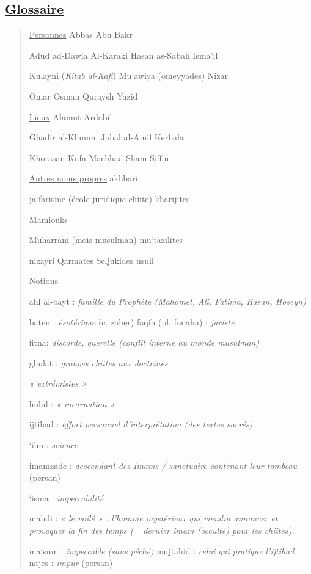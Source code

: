 \hypertarget{glossaire-5}{%
\subsection{\texorpdfstring{\underline{Glossaire}}{Glossaire}}\label{glossaire-5}}

\begin{quote}
\underline{Personnes} Abbas Abu Bakr

Adud ad-Dawla Al-Karaki Hasan as-Sabah Isma'il

Kulayni (\emph{Kitab al-Kafi}) Mu'awiya (omeyyades) Nizar

Omar Osman Quraysh Yazid

\underline{Lieux} Alamut Ardabil

Ghadir al-Khumm Jabal al-Amil Kerbala

Khorasan Kufa Machhad Sham Siffin

\underline{Autres noms propres} akhbari

ja`farisme (école juridique chiite) kharijites

Mamlouks

Muharram (mois musulman) mu`tazilites

nizayri Qarmates Seljukides usuli

\underline{Notions}

ahl al-bayt : \emph{famille du Prophète (Mahomet, Ali, Fatima, Hasan,
Hoseyn)}

baten : \emph{ésotérique} (c. zaher) faqih (pl. fuqaha) : \emph{juriste}

fitna: \emph{discorde, querelle (conflit interne au monde musulman)}

ghulat : \emph{groupes chiites aux doctrines}

\emph{« extrémistes »}

hulul : \emph{« incarnation »}

ijtihad : \emph{effort personnel d'interprétation (des textes sacrés)}

`ilm : \emph{science}

imamzade : \emph{descendant des Imams / sanctuaire contenant leur
tombeau} (persan)

`isma : \emph{impeccabilité}

mahdi : \emph{« le voilé » : l'homme mystérieux qui viendra annoncer et
provoquer la fin des temps (= dernier imam (occulté) pour les chiites).}

ma`sum : \emph{impeccable (sans péché)} mujtahid : \emph{celui qui
pratique l'ijtihad} najes : \emph{impur} (persan)


\end{quote}
